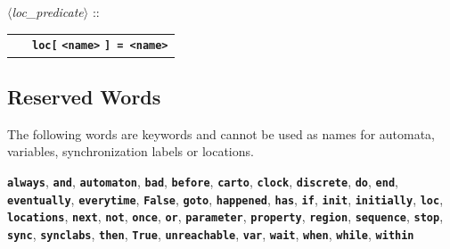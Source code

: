 \documentclass[a4paper,11pt]{article}
\newcommand{\nt}[1]{$\langle$\emph{#1}$\rangle$}
\newcommand{\regleGrammaire}[1]{\bigskip \noindent \nt{#1} :: \\}
\newcommand{\code}[1]{\textbf{\texttt{#1}}}
\begin{document}
\regleGrammaire{loc\_predicate}
\begin{tabular}{l l}
	\  & \code{loc[} \code{<name>} \code{] = \code{<name>}} \\
\end{tabular}





\subsection{Reserved Words}

The following words are keywords and cannot be used as names for automata, variables, synchronization labels or locations. 

\code{always},
\code{and},
\code{automaton},
\code{bad},
\code{before},
\code{carto},
\code{clock},
\code{discrete},
\code{do},
\code{end},
\code{eventually},
\code{everytime},
\code{False},
\code{goto},
\code{happened},
\code{has},
\code{if},
\code{init},
\code{initially},
\code{loc},
\code{locations},
\code{next},
\code{not},
\code{once},
\code{or},
\code{parameter},
\code{property},
\code{region},
\code{sequence},
\code{stop},
\code{sync},
\code{synclabs},
\code{then},
\code{True},
\code{unreachable},
\code{var},
\code{wait},
\code{when},
\code{while},
\code{within}
\end{document}

